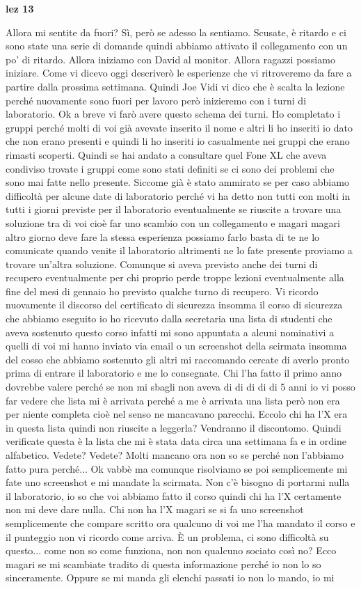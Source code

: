 \textbf{lez 13}

Allora mi sentite da fuori? Sì, però se adesso la sentiamo. Scusate, è ritardo e ci sono state una serie di domande quindi abbiamo attivato il collegamento con un po' di ritardo. Allora iniziamo con David al monitor. Allora ragazzi possiamo iniziare. Come vi dicevo oggi descriverò le esperienze che vi ritroveremo da fare a partire dalla prossima settimana. Quindi Joe Vidi vi dico che è scalta la lezione perché nuovamente sono fuori per lavoro però inizieremo con i turni di laboratorio. Ok a breve vi farò avere questo schema dei turni. Ho completato i gruppi perché molti di voi già avevate inserito il nome e altri li ho inseriti io dato che non erano presenti e quindi li ho inseriti io casualmente nei gruppi che erano rimasti scoperti. Quindi se hai andato a consultare quel Fone XL che aveva condiviso trovate i gruppi come sono stati definiti se ci sono dei problemi che sono mai fatte nello presente. Siccome già è stato ammirato se per caso abbiamo difficoltà per alcune date di laboratorio perché vi ha detto non tutti con molti in tutti i giorni previste per il laboratorio eventualmente se riuscite a trovare una soluzione tra di voi cioè far uno scambio con un collegamento e magari magari altro giorno deve fare la stessa esperienza possiamo farlo basta di te ne lo comunicate quando venite il laboratorio altrimenti ne lo fate presente proviamo a trovare un'altra soluzione. Comunque si aveva previsto anche dei turni di recupero eventualmente per chi proprio perde troppe lezioni eventualmente alla fine del mesi di gennaio ho previsto qualche turno di recupero. Vi ricordo nuovamente il discorso del certificato di sicurezza insomma il corso di sicurezza che abbiamo eseguito io ho ricevuto dalla secretaria una lista di studenti che aveva sostenuto questo corso infatti mi sono appuntata a alcuni nominativi a quelli di voi mi hanno inviato via email o un screenshot della scirmata insomma del cosso che abbiamo sostenuto gli altri mi raccomando cercate di averlo pronto prima di entrare il laboratorio e me lo consegnate. Chi l'ha fatto il primo anno dovrebbe valere perché se non mi sbagli non aveva di di di di di 5 anni io vi posso far vedere che lista mi è arrivata perché a me è arrivata una lista però non era per niente completa cioè nel senso ne mancavano parecchi. Eccolo chi ha l'X era in questa lista quindi non riuscite a leggerla? Vendranno il discontomo. Quindi verificate questa è la lista che mi è stata data circa una settimana fa e in ordine alfabetico. Vedete? Vedete? Molti mancano ora non so se perché non l'abbiamo fatto pura perché... Ok vabbè ma comunque risolviamo se poi semplicemente mi fate uno screenshot e mi mandate la scirmata. Non c'è bisogno di portarmi nulla il laboratorio, io so che voi abbiamo fatto il corso quindi chi ha l'X certamente non mi deve dare nulla. Chi non ha l'X magari se si fa uno screenshot semplicemente che compare scritto ora qualcuno di voi me l'ha mandato il corso e il punteggio non vi ricordo come arriva. È un problema, ci sono difficoltà su questo... come non so come funziona, non non qualcuno sociato così no? Ecco magari se mi scambiate tradito di questa informazione perché io non lo so sinceramente. Oppure se mi manda gli elenchi passati io non lo mando, io mi 